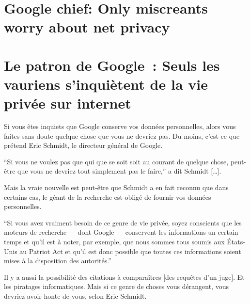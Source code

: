 \section{Google chief: Only miscreants worry about net privacy}

\section*{Le patron de Google : Seuls les vauriens s'inquiètent de la vie privée sur internet}

Si vous êtes inquiets que Google conserve vos données personnelles, alors vous faites sans doute quelque chose que vous ne devriez pas. Du moins, c'est ce que prétend Eric Schmidt, le directeur général de Google.

\enquote{Si vous ne voulez pas que qui que se soit soit au courant de quelque chose, peut-être que vous ne devriez tout simplement pas le faire,} a dit Schmidt […].

Mais la vraie nouvelle est peut-être que Schmidt a en fait reconnu que dans certains cas, le géant de la recherche est obligé de fournir vos données personnelles.

\enquote{Si vous avez vraiment besoin de ce genre de vie privée, soyez conscients que les moteurs de recherche --- dont Google --- conservent les informations un certain temps et qu'il est à noter, par exemple, que nous sommes tous soumis aux États-Unis au Patriot Act et qu'il est donc possible que toutes ces informations soient mises à la disposition des autorités.}

Il y a aussi la possibilité des citations à comparaîtres [des requêtes d'un juge]. Et les piratages informatiques. Mais si ce genre de choses vous dérangent, vous devriez avoir honte de vous, selon Eric Schmidt.
